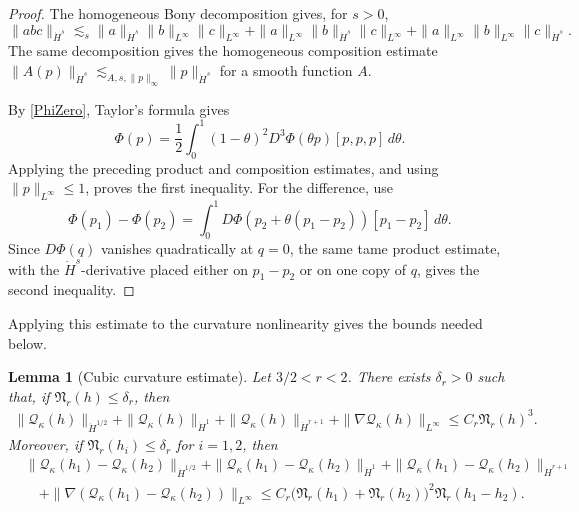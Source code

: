\documentclass[12pt]{amsart}
\newtheorem{lemma}[theorem]{Lemma}
\theoremstyle{remark}
\theoremstyle{definition}
\numberwithin{equation}{section}
\begin{document}
\begin{proof}
The homogeneous Bony decomposition gives, for \(s>0\),
\[
 \|abc\|_{\dot H^s}
 \lesssim_s
 \|a\|_{\dot H^s}\|b\|_{L^\infty}\|c\|_{L^\infty}
 +\|a\|_{L^\infty}\|b\|_{\dot H^s}\|c\|_{L^\infty}
 +\|a\|_{L^\infty}\|b\|_{L^\infty}\|c\|_{\dot H^s}.
\]
The same decomposition gives the homogeneous composition estimate
\(\|A(p)\|_{\dot H^s}\lesssim_{A,s,\|p\|_\infty}\|p\|_{\dot H^s}\)
for a smooth function \(A\).

By \eqref{PhiZero}, Taylor's formula gives
\[
 \Phi(p)=\frac12\int_0^1(1-\theta)^2 D^3\Phi(\theta p)[p,p,p]\,d\theta.
\]
Applying the preceding product and composition estimates, and using
\(\|p\|_{L^\infty}\leq1\), proves the first inequality. 
For the difference, use
\[
 \Phi(p_1)-\Phi(p_2) =\int_0^1D\Phi(p_2+\theta(p_1-p_2))[p_1-p_2]\,d\theta.
\]
Since \(D\Phi(q)\) vanishes quadratically at \(q=0\), the same tame product estimate, with the \(\dot H^s\)-derivative placed either on \(p_1-p_2\) or on one copy of \(q\), gives the second inequality.
\end{proof}

Applying this estimate to the curvature nonlinearity gives the bounds needed below.
\begin{lemma}[Cubic curvature estimate]
\label{lem:curvature-revised}
Let \(3/2<r<2\).
There exists \(\delta_r>0\) such that, if \(\mathfrak N_r(h)\leq\delta_r\), then
\begin{equation*}
\begin{aligned}
 \|\mathcal Q_\kappa(h)\|_{\dot H^{1/2}} + \|\mathcal Q_\kappa(h)\|_{\dot H^1} + \|\mathcal Q_\kappa(h)\|_{\dot H^{r+1}}+ \|\nabla\mathcal Q_\kappa(h)\|_{L^\infty} \leq C_r\mathfrak N_r(h)^3.
\end{aligned}
\end{equation*}
Moreover, if \(\mathfrak N_r(h_i)\leq\delta_r\) for \(i=1,2\), then
\begin{equation*}
\begin{aligned}
 &\|\mathcal Q_\kappa(h_1)-\mathcal Q_\kappa(h_2)\|_{\dot H^{1/2}} + \|\mathcal Q_\kappa(h_1)-\mathcal Q_\kappa(h_2)\|_{\dot H^1}+ \|\mathcal Q_\kappa(h_1)-\mathcal Q_\kappa(h_2)\|_{\dot H^{r+1}}\\
 &\quad+ \|\nabla(\mathcal Q_\kappa(h_1)-\mathcal Q_\kappa(h_2))\|_{L^\infty}\leq C_r \bigl( \mathfrak N_r(h_1)+\mathfrak N_r(h_2) \bigr)^2 \mathfrak N_r(h_1-h_2).
\end{aligned}
\end{equation*}
\end{lemma}
\end{document}
